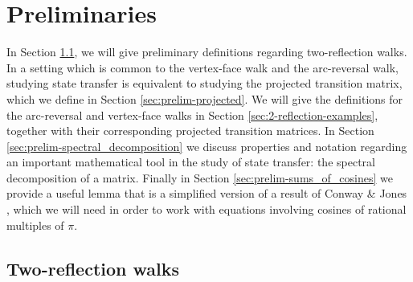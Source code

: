 \documentclass{article}
\numberwithin{equation}{section}
\newcommand\krystalsays[1]{}
\newcommand\vincentsays[1]{}
\begin{document}
\section{Preliminaries}\label{sec:prelim} 
In Section \ref{sec:2reflectionwalks}, we will give preliminary definitions regarding two-reflection walks. In a setting which is common to the vertex-face walk and the arc-reversal walk, studying state transfer is equivalent to studying the projected transition matrix, which we define in Section \ref{sec:prelim-projected}. We will give the definitions for the arc-reversal and vertex-face walks in Section \ref{sec:2-reflection-examples}, together with their corresponding projected transition matrices. In Section \ref{sec:prelim-spectral_decomposition} we discuss properties and notation regarding an important mathematical tool in the study of state transfer: the spectral decomposition of a matrix. Finally in Section \ref{sec:prelim-sums_of_cosines} we provide a useful lemma that is a simplified version of a result of Conway \& Jones \cite{ConJon1976}, which we will need in order to work with equations involving cosines of rational multiples of $\pi$.

\subsection{Two-reflection walks}\label{sec:2reflectionwalks}
\end{document}
